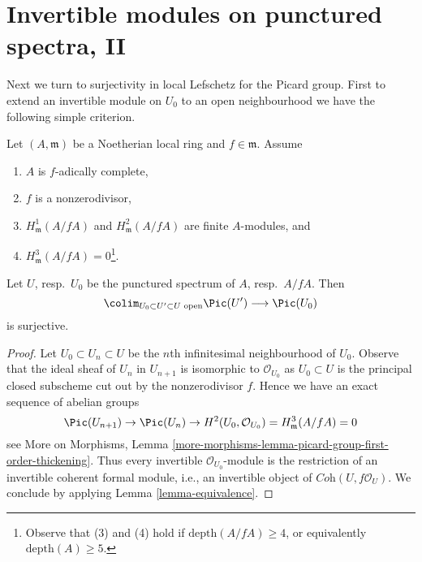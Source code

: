 





\section{Invertible modules on punctured spectra, II}
\label{section-local-lefschetz-for-pic-surjective}

\noindent
Next we turn to surjectivity in local Lefschetz for the Picard group.
First to extend an invertible module on $U_0$ to an open neighbourhood
we have the following simple criterion.

\begin{lemma}
\label{lemma-surjective-Pic-first}
Let $(A, \mathfrak m)$ be a Noetherian local ring and $f \in \mathfrak m$.
Assume
\begin{enumerate}
\item $A$ is $f$-adically complete,
\item $f$ is a nonzerodivisor,
\item $H^1_\mathfrak m(A/fA)$ and $H^2_\mathfrak m(A/fA)$
are finite $A$-modules, and
\item $H^3_\mathfrak m(A/fA) = 0$\footnote{Observe that (3) and (4) hold
if $\text{depth}(A/fA) \geq 4$, or equivalently $\text{depth}(A) \geq 5$.}.
\end{enumerate}
Let $U$, resp.\ $U_0$ be the punctured spectrum of $A$, resp.\ $A/fA$.
Then
$$
\colim_{U_0 \subset U' \subset U\text{ open}} \Pic(U')
\longrightarrow
\Pic(U_0)
$$
is surjective.
\end{lemma}

\begin{proof}
Let $U_0 \subset U_n \subset U$ be the $n$th infinitesimal neighbourhood
of $U_0$. Observe that the ideal sheaf of $U_n$ in $U_{n + 1}$ is
isomorphic to $\mathcal{O}_{U_0}$ as $U_0 \subset U$ is the principal
closed subscheme cut out by the nonzerodivisor $f$. Hence we have
an exact sequence of abelian groups
$$
\Pic(U_{n + 1}) \to \Pic(U_n) \to
H^2(U_0, \mathcal{O}_{U_0}) = H^3_\mathfrak m(A/fA) = 0
$$
see More on Morphisms, Lemma
\ref{more-morphisms-lemma-picard-group-first-order-thickening}.
Thus every invertible $\mathcal{O}_{U_0}$-module is the restriction
of an invertible coherent formal module, i.e., an invertible object of
$\textit{Coh}(U, f\mathcal{O}_U)$. We conclude by applying
Lemma \ref{lemma-equivalence}.
\end{proof}

